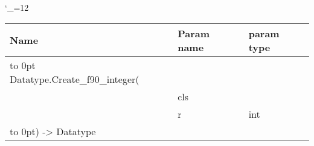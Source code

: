 \begingroup \catcode`\_=12 \tt
\begin{tabular}{lll}
\toprule
\textrm{Name}&\textrm{Param name}&\textrm{param type}\\
\midrule
\hbox to 0pt {Datatype.Create_f90_integer(\hss}\\
& cls\\
& r & int\\
\hbox to 0pt{) -> Datatype\hss}\\
\bottomrule
\end{tabular}
\endgroup
